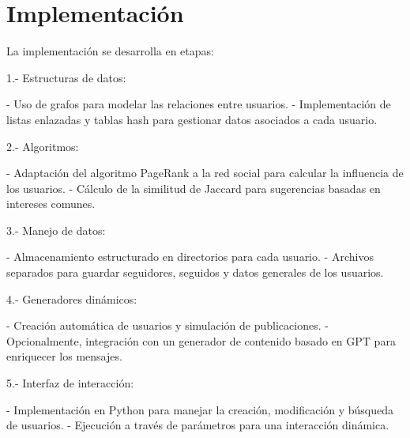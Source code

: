 \section{Implementación}
La implementación se desarrolla en etapas:

    1.- Estructuras de datos:

	    - Uso de grafos para modelar las relaciones entre usuarios.
	    - Implementación de listas enlazadas y tablas hash para gestionar datos asociados a cada usuario.

    2.- Algoritmos:

	    - Adaptación del algoritmo PageRank a la red social para calcular la influencia de los usuarios.
	    - Cálculo de la similitud de Jaccard para sugerencias basadas en intereses comunes.

    3.- Manejo de datos:

	    - Almacenamiento estructurado en directorios para cada usuario.
	    - Archivos separados para guardar seguidores, seguidos y datos generales de los usuarios.

    4.- Generadores dinámicos:

	    - Creación automática de usuarios y simulación de publicaciones.
	    - Opcionalmente, integración con un generador de contenido basado en GPT para enriquecer los mensajes.

    5.- Interfaz de interacción:

	    - Implementación en Python para manejar la creación, modificación y búsqueda de usuarios.
	    - Ejecución a través de parámetros para una interacción dinámica.


